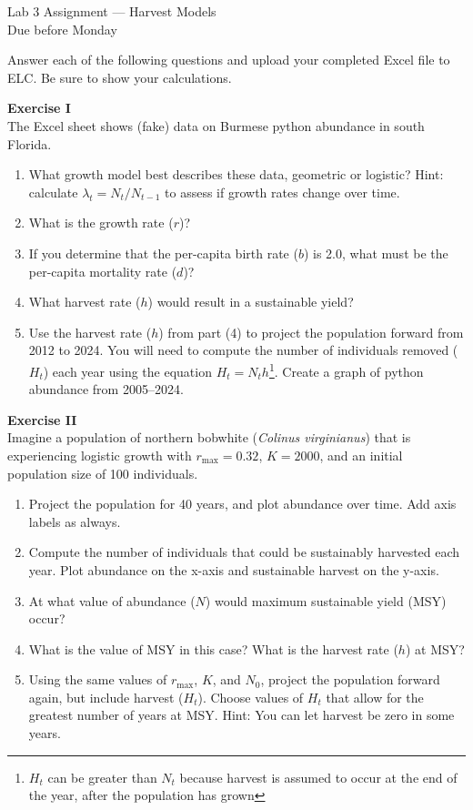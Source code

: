 \documentclass[12pt]{article}\usepackage[]{graphicx}\usepackage[]{color}
\begin{document}
{
  \Large
  \centering
  Lab 3 Assignment --- Harvest Models \\
  Due before Monday \par
}

Answer each of the following questions and upload your completed Excel
file to ELC. Be sure to show your calculations. \par

\vspace{12pt}

{\bf Exercise I \\}
The Excel sheet shows (fake) data on Burmese python abundance in south Florida.
\begin{enumerate}
  \item What growth model best describes these data, geometric or
    logistic?  Hint: calculate $\lambda_t = N_t/N_{t-1}$ to assess if
    growth rates change over time.
  \item What is the growth rate ($r$)?
  \item If you determine that the per-capita birth rate ($b$) is 2.0,
    what must be the per-capita mortality rate ($d$)?
  \item What harvest rate ($h$) would result in a sustainable yield?
  \item Use the harvest rate ($h$) from part (4) to project the population
    forward from 2012 to 2024. You will need to compute the number of
    individuals removed ($H_t$) each year using the equation
    $H_t=N_{t}h$\footnote{$H_t$ can be greater than $N_t$ because
      harvest is assumed to occur at the end of the year, after the
      population has grown}. Create a graph of python abundance from
    2005--2024.  
\end{enumerate}

\vspace{12pt}


{\bf Exercise II \\}
Imagine a population of northern bobwhite ({\it Colinus virginianus})
that is experiencing logistic growth with $r_\mathrm{max} = 0.32$, $K = 2000$,
and an initial population size of 100 individuals.
\begin{enumerate}
  \item Project the population for 40 years, and plot abundance over
    time. Add axis labels as always.
  \item Compute the number of individuals that could be sustainably
    harvested each year. Plot abundance on the x-axis and sustainable
    harvest on the y-axis.
  \item At what value of abundance ($N$) would maximum sustainable yield (MSY) occur?
  \item What is the value of MSY in this case? What is the harvest rate ($h$) at MSY?
  \item Using the same values of $r_\mathrm{max}$, $K$, and $N_0$, project the population
    forward again, but include harvest ($H_t$). Choose values of $H_t$ that
    allow for the greatest number of years at MSY. Hint: You can let
    harvest be zero in some years.
\end{enumerate}
\end{document}
